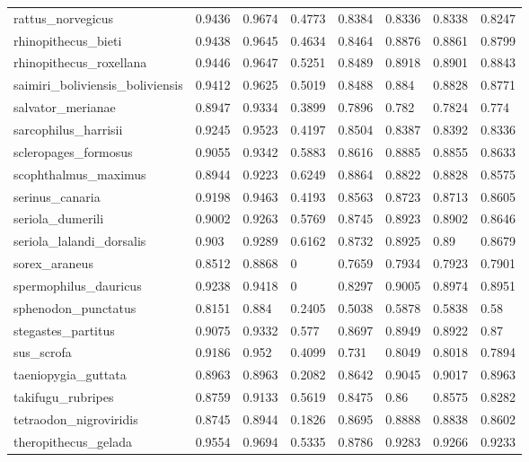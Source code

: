 \documentclass{article}
\begin{document}
\begin{table}[!h]
{\begin{tabular}{@{}llllllll@{}}
rattus\_norvegicus & 0.9436 & 0.9674 & 0.4773 & 0.8384 & 0.8336 & 0.8338 & 0.8247 \\
rhinopithecus\_bieti & 0.9438 & 0.9645 & 0.4634 & 0.8464 & 0.8876 & 0.8861 & 0.8799 \\
rhinopithecus\_roxellana & 0.9446 & 0.9647 & 0.5251 & 0.8489 & 0.8918 & 0.8901 & 0.8843 \\
saimiri\_boliviensis\_boliviensis & 0.9412 & 0.9625 & 0.5019 & 0.8488 & 0.884 & 0.8828 & 0.8771 \\
salvator\_merianae & 0.8947 & 0.9334 & 0.3899 & 0.7896 & 0.782 & 0.7824 & 0.774 \\
sarcophilus\_harrisii & 0.9245 & 0.9523 & 0.4197 & 0.8504 & 0.8387 & 0.8392 & 0.8336 \\
scleropages\_formosus & 0.9055 & 0.9342 & 0.5883 & 0.8616 & 0.8885 & 0.8855 & 0.8633 \\
scophthalmus\_maximus & 0.8944 & 0.9223 & 0.6249 & 0.8864 & 0.8822 & 0.8828 & 0.8575 \\
serinus\_canaria & 0.9198 & 0.9463 & 0.4193 & 0.8563 & 0.8723 & 0.8713 & 0.8605 \\
seriola\_dumerili & 0.9002 & 0.9263 & 0.5769 & 0.8745 & 0.8923 & 0.8902 & 0.8646 \\
seriola\_lalandi\_dorsalis & 0.903 & 0.9289 & 0.6162 & 0.8732 & 0.8925 & 0.89 & 0.8679 \\
sorex\_araneus & 0.8512 & 0.8868 & 0 & 0.7659 & 0.7934 & 0.7923 & 0.7901 \\
spermophilus\_dauricus & 0.9238 & 0.9418 & 0 & 0.8297 & 0.9005 & 0.8974 & 0.8951 \\
sphenodon\_punctatus & 0.8151 & 0.884 & 0.2405 & 0.5038 & 0.5878 & 0.5838 & 0.58 \\
stegastes\_partitus & 0.9075 & 0.9332 & 0.577 & 0.8697 & 0.8949 & 0.8922 & 0.87 \\
sus\_scrofa & 0.9186 & 0.952 & 0.4099 & 0.731 & 0.8049 & 0.8018 & 0.7894 \\
taeniopygia\_guttata & 0.8963 & 0.8963 & 0.2082 & 0.8642 & 0.9045 & 0.9017 & 0.8963 \\
takifugu\_rubripes & 0.8759 & 0.9133 & 0.5619 & 0.8475 & 0.86 & 0.8575 & 0.8282 \\
tetraodon\_nigroviridis & 0.8745 & 0.8944 & 0.1826 & 0.8695 & 0.8888 & 0.8838 & 0.8602 \\
theropithecus\_gelada & 0.9554 & 0.9694 & 0.5335 & 0.8786 & 0.9283 & 0.9266 & 0.9233 \\
\hline
\end{tabular}}
\end{table}
\end{document}
